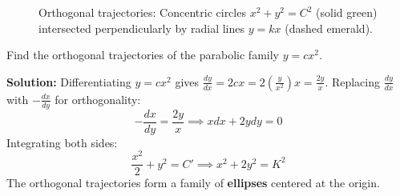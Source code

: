 \documentclass[11pt, a4paper, openany, oneside]{book}
\begin{document}
\begin{figure}[htbp]
\centering
{}
\caption{Orthogonal trajectories: Concentric circles $x^2 + y^2 = C^2$ (solid green) intersected perpendicularly by radial lines $y = k x$ (dashed emerald).}
\label{fig:orthogonal_circles}
\end{figure}

\begin{examplebox}
Find the orthogonal trajectories of the parabolic family $y = c x^2$.

\textbf{Solution:}
Differentiating $y = c x^2$ gives $\frac{dy}{dx} = 2c x = 2\left(\frac{y}{x^2}\right)x = \frac{2y}{x}$.
Replacing $\frac{dy}{dx}$ with $-\frac{dx}{dy}$ for orthogonality:
\[ -\frac{dx}{dy} = \frac{2y}{x} \implies x dx + 2y dy = 0 \]
Integrating both sides:
\begin{equation}
    \frac{x^2}{2} + y^2 = C' \implies x^2 + 2y^2 = K^2
\end{equation}
The orthogonal trajectories form a family of \textbf{ellipses} centered at the origin.
\end{examplebox}
\end{document}
